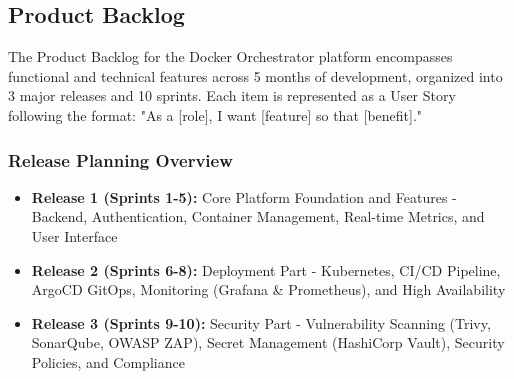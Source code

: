 \subsection{Product Backlog}
The Product Backlog for the Docker Orchestrator platform encompasses functional and technical features across 5 months of development, organized into 3 major releases and 10 sprints. Each item is represented as a User Story following the format: "As a [role], I want [feature] so that [benefit]."

\subsubsection{Release Planning Overview}
\begin{itemize}
    \item \textbf{Release 1 (Sprints 1-5):} Core Platform Foundation and Features - Backend, Authentication, Container Management, Real-time Metrics, and User Interface
    \item \textbf{Release 2 (Sprints 6-8):} Deployment Part - Kubernetes, CI/CD Pipeline, ArgoCD GitOps, Monitoring (Grafana \& Prometheus), and High Availability
    \item \textbf{Release 3 (Sprints 9-10):} Security Part - Vulnerability Scanning (Trivy, SonarQube, OWASP ZAP), Secret Management (HashiCorp Vault), Security Policies, and Compliance
\end{itemize}

